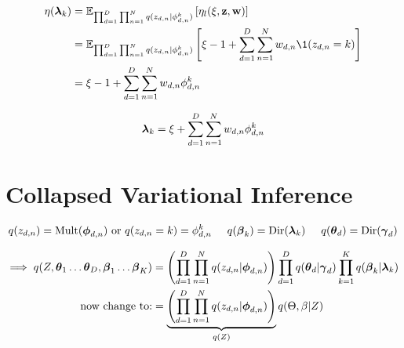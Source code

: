 \documentclass{article}
\begin{document}
\begin{equation}\begin{split}
\eta(\llambda_k) &= \E_{\prod_{d=1}^D \prod_{n=1}^N q(z_{d,n} | \phi^k_{d,n})  } \left[ \eta_l (\xi,  \z, \w ) \right]\\
&=  \E_{\prod_{d=1}^D \prod_{n=1}^N q(z_{d,n} | \phi^k_{d,n})  }  \left[ \xi -1 +  \sum_{d=1}^D \sum_{n=1}^N  w_{d,n}  \1(z_{d,n}= k)  \right]\\
&= \xi -1  +  \sum_{d=1}^D \sum_{n=1}^N  w_{d,n} \phi^k_{d,n}  \\
\end{split}\end{equation}



\begin{equation}\begin{split}
\boldsymbol{\lambda}_k &= \xi  +  \sum_{d=1}^D \sum_{n=1}^N  w_{d,n} \phi^k_{d,n}  \\
\end{split}\end{equation}


\newpage








\section{Collapsed Variational Inference \optional}


\begin{equation}
\begin{split}
&q(z_{d,n}) = \text{Mult}(\boldsymbol{\phi}_{d,n}) \text{ or } q(z_{d,n} = k) = \phi^k_{d,n}
\hspace{5 mm} q(\boldsymbol{\beta}_k) = \text{Dir} (\boldsymbol{\lambda}_k)
\hspace{5 mm} q(\boldsymbol{\theta}_d)= \text{Dir}(\boldsymbol{\gamma}_d)\\
\end{split}
\end{equation}

\begin{equation}
\begin{split}
\implies q(Z, \boldsymbol{\theta}_1\dots \boldsymbol{\theta}_D, \boldsymbol{\beta}_1 \dots \boldsymbol{\beta}_K)
&= \left( \prod_{d=1}^{D} \prod_{n=1}^N q (z_{d,n} | \boldsymbol{\phi}_{d,n})\right) \prod_{d=1}^{D} q (\boldsymbol{\theta}_d | \boldsymbol{\gamma}_d) \prod_{k=1}^K  q (\boldsymbol{\beta}_k| \boldsymbol{\lambda}_k)\\
\text{ now change to:} &=  \underbrace{\left( \prod_{d=1}^{D} \prod_{n=1}^N q (z_{d,n} | \boldsymbol{\phi}_{d,n})\right)}_{q(Z)}  q({ \Theta}, { \beta} | Z)\\
\end{split}
\end{equation}
\end{document}
